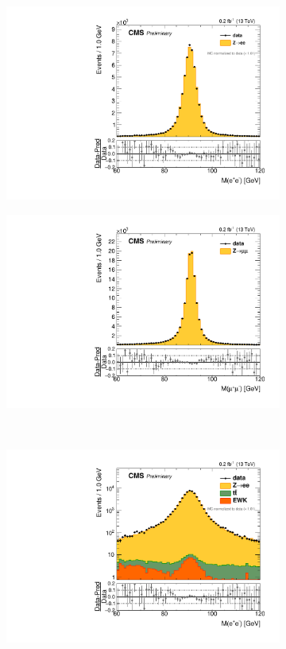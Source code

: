 
\begin{figure}
\centering
\begin{subfigure}{.50\textwidth}
\centering
\includegraphics[width=\linewidth]{plots/Z/13tev/zee_norm.pdf}
\end{subfigure}%
\centering
\begin{subfigure}{.50\textwidth}
\centering
\includegraphics[width=\linewidth]{plots/Z/13tev/zmm.pdf}
\end{subfigure}%
\\
\centering
\begin{subfigure}{.50\textwidth}
\centering
\includegraphics[width=\linewidth]{plots/Z/13tev/zeelog_norm.pdf}

\end{subfigure}
\end{figure}

